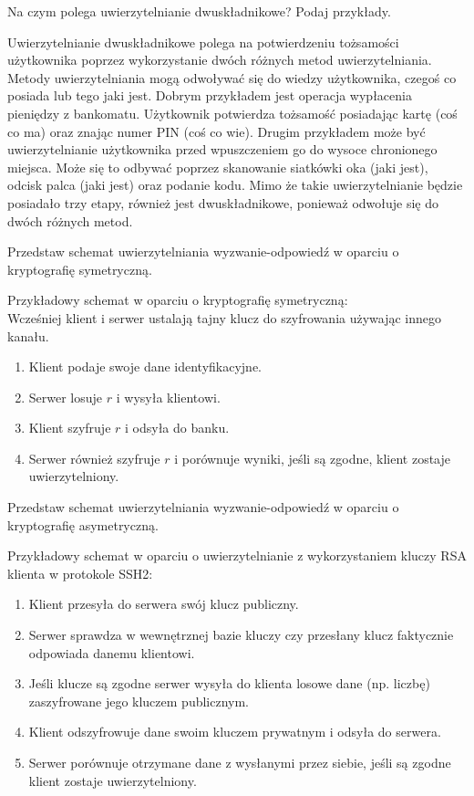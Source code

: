 \documentclass[answers,11pt]{exam}
\begin{document}
\begin{questions}
\question Na czym polega uwierzytelnianie dwuskładnikowe? Podaj przykłady.
\begin{solution}
Uwierzytelnianie dwuskładnikowe polega na potwierdzeniu tożsamości użytkownika poprzez wykorzystanie dwóch różnych metod uwierzytelniania. Metody uwierzytelniania mogą odwoływać się do wiedzy użytkownika, czegoś co posiada lub tego jaki jest. Dobrym przykładem jest operacja wypłacenia pieniędzy z bankomatu. Użytkownik potwierdza tożsamość posiadając kartę (coś co ma) oraz znając numer PIN (coś co wie). Drugim przykładem może być uwierzytelnianie użytkownika przed wpuszczeniem go do wysoce chronionego miejsca. Może się to odbywać poprzez skanowanie siatkówki oka (jaki jest), odcisk palca (jaki jest) oraz podanie kodu. Mimo że takie uwierzytelnianie będzie posiadało trzy etapy, również jest dwuskładnikowe, ponieważ odwołuje się do dwóch różnych metod.
\end{solution}

\question Przedstaw schemat uwierzytelniania wyzwanie-odpowiedź w oparciu o kryptografię symetryczną.
\begin{solution}
Przykładowy schemat w oparciu o kryptografię symetryczną:\\
Wcześniej klient i serwer ustalają tajny klucz do szyfrowania używając innego kanału.
\begin{enumerate}
\item Klient podaje swoje dane identyfikacyjne.
\item Serwer losuje $r$ i wysyła klientowi.
\item Klient szyfruje $r$ i odsyła do banku.
\item Serwer również szyfruje $r$ i porównuje wyniki, jeśli są zgodne, klient zostaje uwierzytelniony.
\end{enumerate}
\end{solution}

\question Przedstaw schemat uwierzytelniania wyzwanie-odpowiedź w oparciu o kryptografię asymetryczną.

\begin{solution}
Przykładowy schemat w oparciu o uwierzytelnianie z wykorzystaniem kluczy RSA klienta w protokole SSH2:
\begin{enumerate}
\item Klient przesyła do serwera swój klucz publiczny.
\item Serwer sprawdza w wewnętrznej bazie kluczy czy przesłany klucz faktycznie odpowiada danemu klientowi.
\item Jeśli klucze są zgodne serwer wysyła do klienta losowe dane (np. liczbę) zaszyfrowane jego kluczem publicznym.
\item Klient odszyfrowuje dane swoim kluczem prywatnym i odsyła do serwera.
\item Serwer porównuje otrzymane dane z wysłanymi przez siebie, jeśli są zgodne klient zostaje uwierzytelniony.
\end{enumerate}
\end{solution}


\end{questions}
\end{document}
